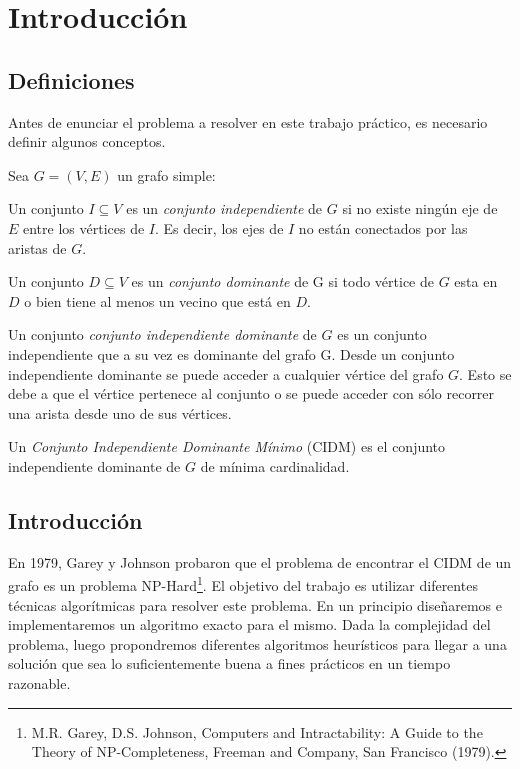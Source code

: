 \section{Introducción}

\subsection{Definiciones}

Antes de enunciar el problema a resolver en este trabajo práctico, es necesario definir algunos conceptos.

Sea $G = (V,E)$ un grafo simple:
\begin{definition}
Un conjunto $I \subseteq V$ es un \textit{conjunto independiente} de $G$ si no existe ningún eje de $E$ entre los vértices de $I$. Es decir, los ejes de $I$ no están conectados por las aristas de $G$.
\end{definition}

\begin{definition}
Un conjunto $D \subseteq V$ es un \textit{conjunto dominante} de G si todo vértice de $G$ esta en $D$ o bien tiene al menos un vecino que está en $D$.
\end{definition}

\begin{definition}
Un conjunto \textit{conjunto independiente dominante} de $G$ es un conjunto independiente que a su vez es dominante del grafo G. Desde un conjunto independiente dominante se puede acceder a cualquier vértice del grafo $G$. Esto se debe a que el vértice pertenece al conjunto o se puede acceder con sólo recorrer una arista desde uno de sus vértices.
\end{definition}

\begin{definition}
Un \textit{Conjunto Independiente Dominante Mínimo} (CIDM) es el conjunto independiente dominante de $G$ de mínima cardinalidad.
\end{definition}

\subsection{Introducción}
En 1979, Garey y Johnson probaron que el problema de encontrar el CIDM de un grafo es un problema NP-Hard\footnote{M.R. Garey, D.S. Johnson, Computers and Intractability: A Guide to the Theory of NP-Completeness, Freeman and Company, San Francisco (1979).}.
El objetivo del trabajo es utilizar diferentes técnicas algorítmicas para resolver este problema. En un principio diseñaremos e implementaremos un algoritmo exacto para el mismo. Dada la complejidad del problema, luego propondremos diferentes algoritmos heurísticos para llegar a una solución que sea lo suficientemente buena a fines prácticos en un tiempo razonable.

